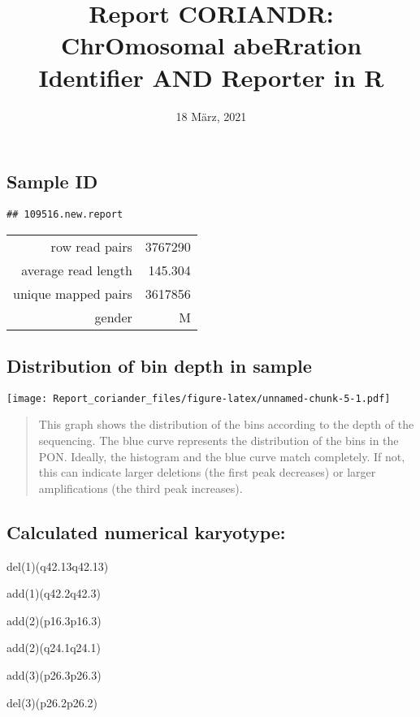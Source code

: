 \documentclass[]{article}
\title{Report CORIANDR: ChrOmosomal abeRration Identifier AND Reporter in R}
\author{}
\date{18 März, 2021}
\begin{document}
\maketitle

\hypertarget{sample-id}{%
\subsection{Sample ID}\label{sample-id}}

\begin{verbatim}
## 109516.new.report
\end{verbatim}

\begin{longtable}[]{@{}rr@{}}
\toprule
\endhead
row read pairs & 3767290\tabularnewline
average read length & 145.304\tabularnewline
unique mapped pairs & 3617856\tabularnewline
gender & M\tabularnewline
\bottomrule
\end{longtable}

\hypertarget{distribution-of-bin-depth-in-sample}{%
\subsection{Distribution of bin depth in
sample}\label{distribution-of-bin-depth-in-sample}}

\texttt{[image: Report\_coriander\_files/figure-latex/unnamed-chunk-5-1.pdf]}

\begin{quote}
This graph shows the distribution of the bins according to the depth of
the sequencing. The blue curve represents the distribution of the bins
in the PON. Ideally, the histogram and the blue curve match completely.
If not, this can indicate larger deletions (the first peak decreases) or
larger amplifications (the third peak increases).
\end{quote}

\hypertarget{calculated-numerical-karyotype}{%
\subsection{Calculated numerical
karyotype:}\label{calculated-numerical-karyotype}}

del(1)(q42.13q42.13)

add(1)(q42.2q42.3)

add(2)(p16.3p16.3)

add(2)(q24.1q24.1)

add(3)(p26.3p26.3)

del(3)(p26.2p26.2)
\end{document}
